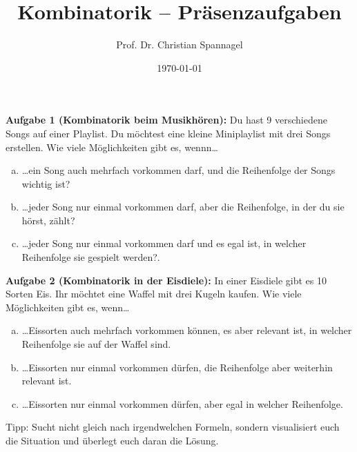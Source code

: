 \documentclass{cssheet}
\title{Kombinatorik -- Präsenzaufgaben}
\author{Prof. Dr. Christian Spannagel}
\date{\today}
\begin{document}
\printtitle

\vspace*{10mm}

\textbf{Aufgabe 1 (Kombinatorik beim Musikhören):}  Du hast 9 verschiedene Songs auf einer Playlist. Du möchtest eine kleine Miniplaylist mit drei Songs erstellen. Wie viele Möglichkeiten gibt es, wennn\ldots
\begin{enumerate}[a)]
	\item \ldots ein Song auch mehrfach vorkommen darf, und die Reihenfolge der Songs wichtig ist?
	\item \ldots  jeder Song nur einmal vorkommen darf, aber die Reihenfolge, in der du sie hörst, zählt?
	\item \ldots jeder Song nur einmal vorkommen darf und es egal ist, in welcher Reihenfolge sie gespielt werden?.
\end{enumerate}


\textbf{Aufgabe 2 (Kombinatorik in der Eisdiele):}  In einer Eisdiele gibt es 10 Sorten Eis. Ihr möchtet eine Waffel mit drei Kugeln kaufen. Wie viele Möglichkeiten gibt es, wenn\ldots
\begin{enumerate}[a)]
\item \ldots Eissorten auch mehrfach vorkommen können, es aber relevant ist, in welcher Reihenfolge sie auf der Waffel sind.
\item \ldots Eissorten nur einmal vorkommen dürfen, die Reihenfolge aber weiterhin relevant ist.
\item \ldots Eissorten nur einmal vorkommen dürfen, aber egal in welcher Reihenfolge.
\end{enumerate}

Tipp: Sucht nicht gleich nach irgendwelchen Formeln, sondern visualisiert euch die Situation und überlegt euch daran die Lösung.


\vspace*{3cm}

\printlicense

\printsocials
\end{document}
